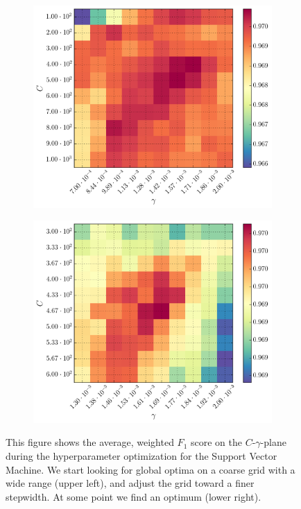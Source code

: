 \begin{figure}[ht!]
\begin{subfigure}[t]{0.49\textwidth}
	\end{subfigure}
	\begin{subfigure}[t]{0.49\textwidth}
		\centering
		\includegraphics[width=\textwidth]{figures/gridsearch/svm/superclasses/svm-superclasses-05.png}
	\end{subfigure}
	\begin{subfigure}[t]{0.49\textwidth}
		\centering
		\includegraphics[width=\textwidth]{figures/gridsearch/svm/superclasses/svm-superclasses-06.png}
	\end{subfigure}
	\caption[Hyperparameter optimization for the Support Vector Machine (SVM)]{This figure shows the average, weighted $F_1$ score on the $C$-$\gamma$-plane during the hyperparameter optimization for the Support Vector Machine. We start looking for global optima on a coarse grid with a wide range (upper left), and adjust the grid toward a finer stepwidth. At some point we find an optimum (lower right).}
	\label{fig:gridsearch-svm-superclasses}
\end{figure}

